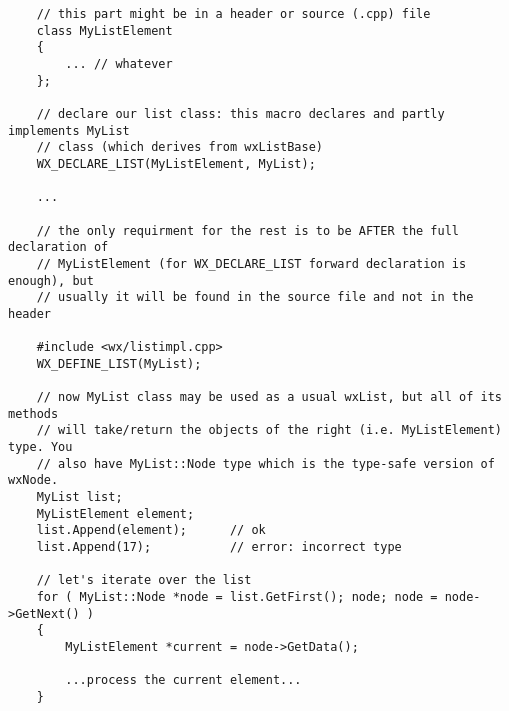 {\small%
\begin{verbatim}
    // this part might be in a header or source (.cpp) file
    class MyListElement
    {
        ... // whatever
    };

    // declare our list class: this macro declares and partly implements MyList
    // class (which derives from wxListBase)
    WX_DECLARE_LIST(MyListElement, MyList);

    ...

    // the only requirment for the rest is to be AFTER the full declaration of
    // MyListElement (for WX_DECLARE_LIST forward declaration is enough), but
    // usually it will be found in the source file and not in the header

    #include <wx/listimpl.cpp>
    WX_DEFINE_LIST(MyList);

    // now MyList class may be used as a usual wxList, but all of its methods
    // will take/return the objects of the right (i.e. MyListElement) type. You
    // also have MyList::Node type which is the type-safe version of wxNode.
    MyList list;
    MyListElement element;
    list.Append(element);      // ok
    list.Append(17);           // error: incorrect type

    // let's iterate over the list
    for ( MyList::Node *node = list.GetFirst(); node; node = node->GetNext() )
    {
        MyListElement *current = node->GetData();

        ...process the current element...
    }
\end{verbatim}
}

